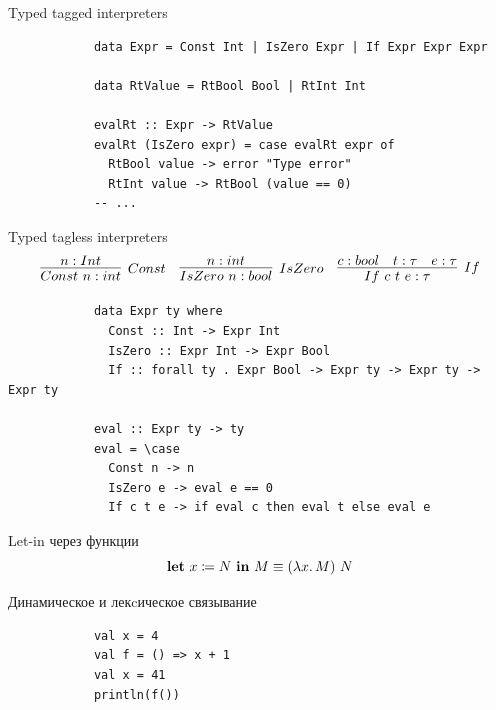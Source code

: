     \begin{frame}[fragile]{Typed tagged interpreters}
        \pause
        \begin{verbatim}
            data Expr = Const Int | IsZero Expr | If Expr Expr Expr

            data RtValue = RtBool Bool | RtInt Int

            evalRt :: Expr -> RtValue
            evalRt (IsZero expr) = case evalRt expr of
              RtBool value -> error "Type error"
              RtInt value -> RtBool (value == 0)
            -- ...
        \end{verbatim}
    \end{frame}

    \begin{frame}[fragile]{Typed tagless interpreters}
        \pause
        \begin{equation*}{}
            \infer[Const]{Const~n : int}{n : Int}
            \quad
            \infer[IsZero]{IsZero~n : bool}{n : int}
            \quad
            \infer[If]{If~c~t~e : \tau}{c : bool & t : \tau & e : \tau}
        \end{equation*}
        \pause
        \begin{verbatim}
            data Expr ty where
              Const :: Int -> Expr Int
              IsZero :: Expr Int -> Expr Bool
              If :: forall ty . Expr Bool -> Expr ty -> Expr ty -> Expr ty

            eval :: Expr ty -> ty
            eval = \case
              Const n -> n
              IsZero e -> eval e == 0
              If c t e -> if eval c then eval t else eval e
        \end{verbatim}
    \end{frame}


    \begin{frame}[fragile]{Let-in через функции}
        \pause
        \[
            \mathbf{let} ~ x \coloneqq N ~ \mathbf{in} ~ M \equiv (\lambda x\ldotp M) ~ N
        \]
    \end{frame}

    \begin{frame}[fragile]{Динамическое и лекcическое связывание}
        \pause
        \begin{verbatim}
            val x = 4
            val f = () => x + 1
            val x = 41
            println(f())
        \end{verbatim}
    \end{frame}

